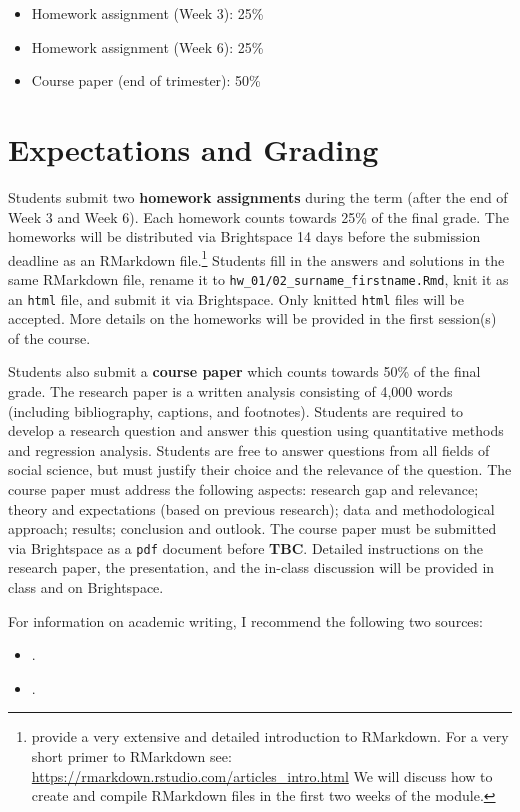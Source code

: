 \documentclass[abstract=on,parskip=full,headings=standardclasses,fontsize=11pt,paper=a4]{scrartcl}
\begin{document}
\begin{itemize}
\item Homework assignment (Week 3): 25\% 
\item Homework assignment  (Week 6): 25\% 
\item Course paper (end of trimester): 50\%
\end{itemize}


\section*{Expectations and Grading}


Students submit two \textbf{homework assignments} during the term (after the end of Week 3 and Week 6). Each homework counts towards 25\% of the final grade.  The homeworks will be distributed via Brightspace 14 days before the submission deadline as an RMarkdown file.\footnote{\textcite{xie18} provide a very extensive and detailed introduction to RMarkdown. For a very short primer to RMarkdown see: \url{https://rmarkdown.rstudio.com/articles_intro.html} We will discuss how to create and compile RMarkdown files in the first two weeks of the module.} Students fill in the answers and solutions in the same RMarkdown file, rename it to \texttt{hw\_01/02\_surname\_firstname.Rmd}, knit it as an \texttt{html} file, and submit it via Brightspace. Only knitted \texttt{html} files will be accepted. More details on the homeworks will be provided in the first session(s) of the course.


Students also submit a \textbf{course paper} which counts towards 50\% of the final grade. The research paper is a written analysis consisting of 4,000 words (including bibliography, captions, and footnotes). Students are required to develop a research question and answer this question using quantitative methods and regression analysis. Students are free to answer questions from all fields of social science, but must justify their choice and the relevance of the question. The course paper must address the following aspects: research gap and relevance; theory and expectations (based on previous research); data and methodological approach; results; conclusion and outlook. The course paper must be submitted via Brightspace as a \texttt{pdf} document before \textbf{TBC}.  Detailed instructions on the research paper, the presentation, and the in-class discussion will be provided in class and on Brightspace.

For information on academic writing, I recommend the following two sources:
\begin{itemize}
\item {}.
\item {}.
\end{itemize}
\end{document}
